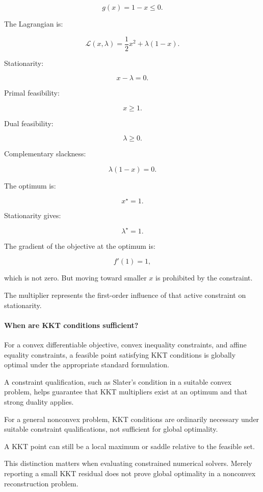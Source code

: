 \[
g(x)=1-x\le0.
\]

The Lagrangian is:

\[
\mathcal L(x,\lambda) = \frac12x^2+\lambda(1-x).
\]

Stationarity:

\[
x-\lambda=0.
\]

Primal feasibility:

\[
x\ge1.
\]

Dual feasibility:

\[
\lambda\ge0.
\]

Complementary slackness:

\[
\lambda(1-x)=0.
\]

The optimum is:

\[
\boxed{x^\star=1}.
\]

Stationarity gives:

\[
\boxed{\lambda^\star=1}.
\]

The gradient of the objective at the optimum is:

\[
f'(1)=1,
\]

which is not zero. But moving toward smaller \(x\) is prohibited by the constraint.

The multiplier represents the first-order influence of that active constraint on stationarity.

\paragraph{When are KKT conditions sufficient?}\label{02-foundations-ii-ch026-when-are-kkt-conditions-sufficient}

For a convex differentiable objective, convex inequality constraints, and affine equality constraints, a feasible point satisfying KKT conditions is globally optimal under the appropriate standard formulation.

A constraint qualification, such as Slater's condition in a suitable convex problem, helps guarantee that KKT multipliers exist at an optimum and that strong duality applies.

For a general nonconvex problem, KKT conditions are ordinarily necessary under suitable constraint qualifications, not sufficient for global optimality.

A KKT point can still be a local maximum or saddle relative to the feasible set.

This distinction matters when evaluating constrained numerical solvers. Merely reporting a small KKT residual does not prove global optimality in a nonconvex reconstruction problem. 

